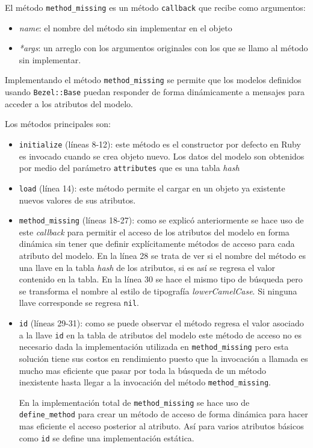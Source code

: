 El método \texttt{method\_missing} es un método \texttt{callback} que recibe
como argumentos:
\begin{itemize}
\item \textit{name}: el nombre del método sin implementar en el objeto
\item \textit{*args}: un arreglo con los argumentos originales con los
  que se llamo al método sin implementar.
\end{itemize}

Implementando el método \texttt{method\_missing} se permite
que los modelos definidos usando \texttt{Bezel::Base} puedan responder
de forma dinámicamente a mensajes para acceder a los atributos del modelo.

\vspace{2.5mm}

Los métodos principales son:
\begin{itemize}
\item \texttt{initialize} (líneas 8-12): este método es el constructor por defecto
  en Ruby es invocado cuando se crea objeto nuevo. Los datos del modelo son obtenidos
  por medio del parámetro \texttt{attributes} que es una tabla \textit{hash}
\end{itemize}

\begin{itemize}
\item \texttt{load} (línea 14): este método permite el cargar en un objeto ya
  existente nuevos valores de sus atributos.
\item \texttt{method\_missing} (líneas 18-27): como se explicó anteriormente se hace
  uso de este \textit{callback} para permitir el acceso de los atributos del modelo
  en forma dinámica sin tener que definir explícitamente métodos de acceso para cada
  atributo del modelo.
  En la línea 28 se trata de ver si el nombre del método es una llave en la tabla
  \textit{hash} de los atributos, si es así se regresa el valor contenido en la
  tabla.
  En la línea 30 se hace el mismo tipo de búsqueda pero se transforma el
  nombre al estilo de tipografía \textit{lowerCamelCase}.
  Si ninguna llave corresponde se regresa \texttt{nil}.
\item \texttt{id} (líneas 29-31): como se puede observar el método regresa
  el valor asociado a la llave \texttt{id} en la tabla de atributos del modelo
  este método de acceso no es necesario dada la implementación utilizada
  en \texttt{method\_missing} pero esta solución tiene sus costos en rendimiento
  puesto que la invocación a llamada es mucho mas eficiente que pasar por toda
  la búsqueda de un método inexistente hasta llegar a la invocación del método
  \texttt{method\_missing}.

  En la implementación total de \texttt{method\_missing} se hace uso de
  \texttt{define\_method} para crear un método de acceso de forma dinámica para
  hacer mas eficiente el acceso posterior al atributo.
  Así para varios atributos básicos como \texttt{id} se define una implementación
  estática.
\end{itemize}

